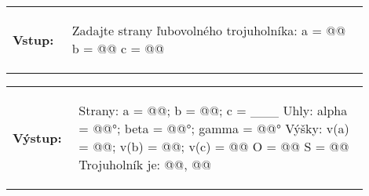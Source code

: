\begin{tabular}{@{}p{0.15\linewidth}p{0.75\linewidth}}
\textbf{\small Vstup:} &
\vspace{-3em}
\begin{code}
Zadajte strany ľubovolného trojuholníka:
a = @\fbox{\phantom{vstup}}@
b = @\fbox{\phantom{vstup}}@
c = @\fbox{\phantom{vstup}}@
\end{code}
\end{tabular}

\vspace{-2em}
\begin{tabular}{@{}p{0.15\linewidth}p{0.75\linewidth}}
\textbf{\small Výstup:} &
\vspace{-3em}
\begin{code}
Strany: a = @\fbox{\phantom{abc}}@; b = @\fbox{\phantom{abc}}@; c = ___
Uhly: alpha = @\fbox{\phantom{abc}}@°; beta = @\fbox{\phantom{abc}}@°; gamma = @\fbox{\phantom{vstup}}@°
Výšky: v(a) = @\fbox{\phantom{abc}}@; v(b) = @\fbox{\phantom{abc}}@; v(c) = @\fbox{\phantom{abc}}@
O = @\fbox{\phantom{abc}}@
S = @\fbox{\phantom{abc}}@
Trojuholník je: @\fbox{\phantom{abc}}@, @\fbox{\phantom{abc}}@
\end{code}
\end{tabular}
\vspace{-2em}
